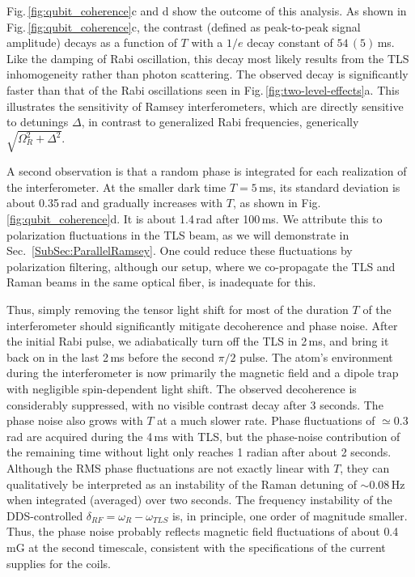 Fig.\,\ref{fig:qubit_coherence}c and d show the outcome of this analysis. As shown in Fig.\,\ref{fig:qubit_coherence}c, the contrast (defined as peak-to-peak signal amplitude) decays as a function of $T$ with a $1/e$ decay constant of {$54\,(5)$\,ms}. Like the damping of Rabi oscillation, this decay most likely results from the TLS inhomogeneity rather than photon scattering. The observed decay is significantly faster than that of the Rabi oscillations seen in Fig.\,\ref{fig:two-level-effects}a. This illustrates the sensitivity of Ramsey interferometers, which are directly sensitive to detunings $\Delta$, in contrast to generalized Rabi frequencies, generically $\sqrt{\Omega_R^2+\Delta^2}$.

A second observation is that a random phase is integrated for each realization of the interferometer. At the smaller dark time {$T = 5\,$ms}, its standard deviation is about {0.35\,rad} and gradually increases with $T$, as shown in Fig.\,\ref{fig:qubit_coherence}d. It is about {1.4\,rad} after {100\,ms}. We attribute this to polarization fluctuations in the TLS beam, as we will demonstrate in Sec.~\ref{SubSec:ParallelRamsey}. One could reduce these fluctuations by polarization filtering, although our setup, where we co-propagate the TLS and Raman beams in the same optical fiber, is inadequate for this. 

Thus, simply removing the tensor light shift for most of the duration $T$ of the interferometer should significantly mitigate decoherence and phase noise. After the initial Rabi pulse, we adiabatically turn off the TLS in {2\,ms}, and bring it back on in the last {2\,ms} before the second $\pi/2$ pulse. The atom's environment during the interferometer is now primarily the magnetic field and a dipole trap with negligible spin-dependent light shift. The observed decoherence is considerably suppressed, with no visible contrast decay after 3 seconds. The phase noise also grows with $T$ at a much slower rate. Phase fluctuations of $\simeq 0.3$ rad are acquired during the {4\,ms} with TLS, but the phase-noise contribution of the remaining time without light only reaches 1 radian after about 2 seconds. Although the RMS phase fluctuations are not exactly linear with $T$, they can qualitatively be interpreted as an instability of the Raman detuning of {$\sim 0.08\,$Hz} when integrated (averaged) over two seconds. The frequency instability of the DDS-controlled $\delta_{RF} = \omega_R - \omega_{TLS}$ is, in principle, one order of magnitude smaller. Thus, the phase noise probably reflects magnetic field fluctuations of about {0.4\,mG} at the second timescale, consistent with the specifications of the current supplies for the coils. 


